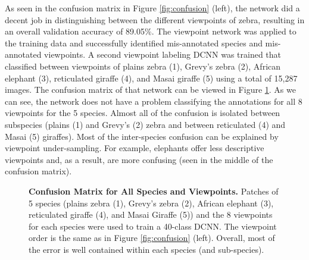 As seen in the confusion matrix in Figure \ref{fig:confusion} (left), the network did a decent job in distinguishing between the different viewpoints of zebra, resulting in an overall validation accuracy of 89.05\%.  The viewpoint network was applied to the training data and successfully identified mis-annotated species and mis-annotated viewpoints.  A second viewpoint labeling DCNN was trained that classified between viewpoints of plains zebra (1), Grevy's zebra (2), African elephant (3), reticulated giraffe (4), and Masai giraffe (5) using a total of 15,287 images.  The confusion matrix of that network can be viewed in Figure \ref{fig:viewpoint-all}.  As we can see, the network does not have a problem classifying the annotations for all 8 viewpoints for the 5 species.  Almost all of the confusion is isolated between subspecies (plains (1) and Grevy's (2) zebra and between reticulated (4) and Masai (5) giraffes).  Most of the inter-species confusion can be explained by viewpoint under-sampling.  For example, elephants offer less descriptive viewpoints and, as a result, are more confusing (seen in the middle of the confusion matrix).

\begin{figure}[t]%
    \centering
        \caption[Confusion Matrix for All Species and Viewpoints]{\textbf{Confusion Matrix for All Species and Viewpoints.}  Patches of 5 species (plains zebra (1), Grevy's zebra (2), African elephant (3), reticulated giraffe (4), and Masai Giraffe (5)) and the 8 viewpoints for each species were used to train a 40-class DCNN.  The viewpoint order is the same as in Figure \ref{fig:confusion} (left).  Overall, most of the error is well contained within each species (and sub-species).}
        \label{fig:viewpoint-all}
\end{figure}

